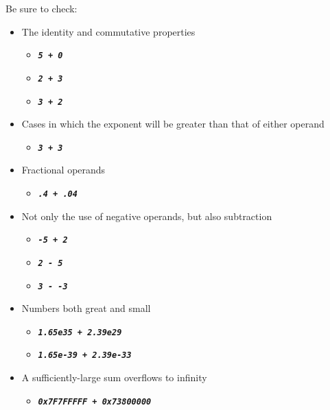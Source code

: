 \begin{description}
\end{description}
Be sure to check:
\begin{itemize}
    \item The identity and commutative properties
    \begin{itemize}
        \item[] \texttt{\textbf{\textit{5 + 0}}}
        \item[] \texttt{\textbf{\textit{2 + 3}}}
        \item[] \texttt{\textbf{\textit{3 + 2}}}
    \end{itemize}
    \item Cases in which the exponent will be greater than that of either operand
    \begin{itemize}
        \item[] \texttt{\textbf{\textit{3 + 3}}}
    \end{itemize}
    \item Fractional operands
    \begin{itemize}
        \item[] \texttt{\textbf{\textit{.4 + .04}}}
    \end{itemize}
    \item Not only the use of negative operands, but also subtraction
    \begin{itemize}
        \item[] \texttt{\textbf{\textit{-5 + 2}}}
        \item[] \texttt{\textbf{\textit{2 - 5}}}
        \item[] \texttt{\textbf{\textit{3 - -3}}}
    \end{itemize}
    \item Numbers both great and small
    \begin{itemize}
        \item[] \texttt{\textbf{\textit{1.65e35 + 2.39e29}}}
        \item[] \texttt{\textbf{\textit{1.65e-39 + 2.39e-33}}}
    \end{itemize}
    \item A sufficiently-large sum overflows to infinity
    \begin{itemize}
        \item[] \texttt{\textbf{\textit{0x7F7FFFFF + 0x73800000}}}
    \end{itemize}

\end{itemize}
